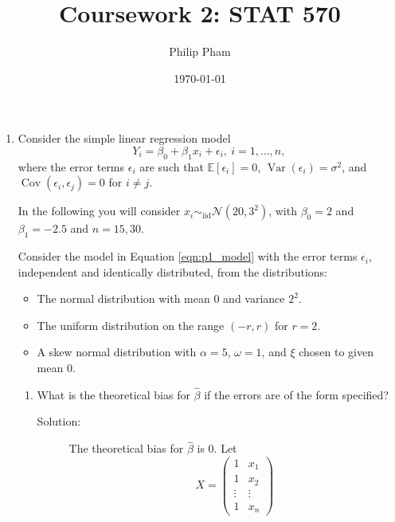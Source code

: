 \documentclass[letterpaper,11pt]{article}
\title{Coursework 2: STAT 570}
\author{Philip Pham}
\date{\today}
\begin{document}
\maketitle
\begin{enumerate}
\item Consider the simple linear regression model
  \begin{equation*}
    Y_i = \beta_0 + \beta_1x_i + \epsilon_i,~i = 1,\ldots,n,
    \label{eqn:p1_model}    
  \end{equation*}
  where the error terms $\epsilon_i$ are such that
  $\mathbb{E}\left[\epsilon_i\right] = 0$,
  $\operatorname{Var}\left(\epsilon_i\right) = \sigma^2$, and
  $\operatorname{Cov}\left(\epsilon_i, \epsilon_j\right) = 0$ for $i \neq j$.

  In the following you will consider
  $x_i \sim_{\mathrm{iid}} \mathcal{N}\left(20, 3^2\right)$, with $\beta_0 = 2$
  and $\beta_1 = -2.5$ and $n=15,30$.

  Consider the model in Equation \ref{eqn:p1_model} with the error terms
  $\epsilon_i$, independent and identically distributed, from the distributions:
  \begin{itemize}
  \item The normal distribution with mean $0$ and variance $2^2$.
  \item The uniform distribution on the range $(-r,r)$ for $r = 2$.
  \item A skew normal distribution with $\alpha = 5$, $\omega = 1$, and $\xi$
    chosen to given mean $0$.
  \end{itemize}

  \begin{enumerate}
  \item What is the theoretical bias for $\hat{\beta}$ if the errors are of the
    form specified?

    \begin{description}
    \item[Solution:] The theoretical bias for $\hat{\beta}$ is $0$. Let
      \begin{equation}
        X = \begin{pmatrix}
          1 & x_1 \\
          1 & x_2 \\
          \vdots & \vdots \\
          1 & x_n
        \end{pmatrix}
        \label{eqn:p1_X}
      \end{equation}
      

\end{description}
\end{enumerate}
\end{enumerate}
\end{document}
